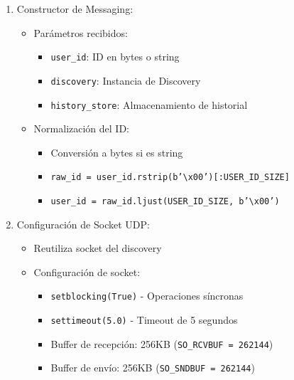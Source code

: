 \documentclass[12pt]{article}
\begin{document}
\begin{enumerate}
    \item Constructor de Messaging:
    \begin{itemize}
        \item Parámetros recibidos:
        \begin{itemize}
            \item \texttt{user\_id}: ID en bytes o string
            \item \texttt{discovery}: Instancia de Discovery
            \item \texttt{history\_store}: Almacenamiento de historial
        \end{itemize}
        \item Normalización del ID:
        \begin{itemize}
            \item Conversión a bytes si es string
            \item \texttt{raw\_id = user\_id.rstrip(b'\textbackslash x00')[:USER\_ID\_SIZE]}
            \item \texttt{user\_id = raw\_id.ljust(USER\_ID\_SIZE, b'\textbackslash x00')}
        \end{itemize}
    \end{itemize}

    \item Configuración de Socket UDP:
    \begin{itemize}
        \item Reutiliza socket del discovery
        \item Configuración de socket:
        \begin{itemize}
            \item \texttt{setblocking(True)} - Operaciones síncronas
            \item \texttt{settimeout(5.0)} - Timeout de 5 segundos
            \item Buffer de recepción: 256KB (\texttt{SO\_RCVBUF = 262144})
            \item Buffer de envío: 256KB (\texttt{SO\_SNDBUF = 262144})
        \end{itemize}
    \end{itemize}


\end{enumerate}
\end{document}
